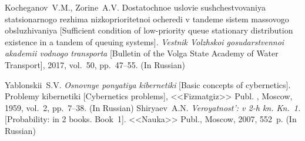 \documentclass[a4paper,twoside]{article}
\theoremstyle{theorem}
\theoremstyle{remark}
\begin{document}
\begin{thebibliography}{99}
\bibitem{} Kocheganov~V.M., Zorine~A.V. Dostatochnoe uslovie sushchestvovaniya statsionarnogo rezhima nizkoprioritetnoi ocheredi v tandeme sistem massovogo obsluzhivaniya [Sufficient condition of low-priority queue stationary distribution existence in a tandem of queuing systems]. {\it Vestnik Volzhskoi gosudarstvennoi akademii vodnogo transporta} [Bulletin of the Volga State Academy of Water Transport], 2017, vol.~50, pp.~47--55. (In Russian)

\bibitem{} Yablonskii~S.V. {\it Osnovnye ponyatiya kibernetiki} [Basic concepts of cybernetics].  Problemy kibernetiki [Cybernetics problems], <<Fizmatgiz>> Publ.  , Moscow, 1959, vol.~2, pp.~7--38. (In Russian)
\bibitem{} Shiryaev~A.N. {\it Veroyatnost': v 2-h kn. Kn.~1.} [Probability: in 2 books. Book~1]. <<Nauka>> Publ., Moscow, 2007, 552~p. (In Russian)

\end{thebibliography} 
\end{document}
